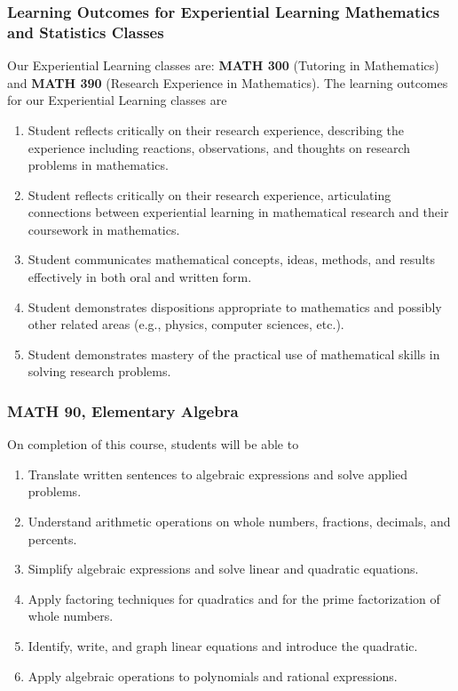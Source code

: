 \documentclass[11pt]{article}
\newenvironment{alphalist}{
\begin{enumerate}[label=(\arabic*),widest=107 ,leftmargin=25pt, itemsep=0pt]}
{\end{enumerate}}
\begin{document}
\subsubsection*{Learning Outcomes for Experiential Learning Mathematics and Statistics Classes}

Our Experiential Learning classes are: \textbf{MATH 300} 
(Tutoring in Mathematics) and \textbf{MATH 390} (Research Experience in Mathematics).
The learning outcomes for our Experiential Learning classes are
\begin{alphalist}
    \item  Student reflects critically on their research experience, describing the experience including reactions, observations, and thoughts on research problems in mathematics.
\item Student reflects critically on their research experience, articulating connections between experiential learning in mathematical research and their coursework in mathematics.
\item Student communicates mathematical concepts, ideas, methods, and results effectively in both oral and written form. 
\item Student demonstrates dispositions appropriate to mathematics and possibly other related areas (e.g., physics, computer sciences, etc.).
\item Student demonstrates mastery of the practical use of mathematical skills in solving research problems.
\end{alphalist}

\subsubsection*{MATH 90, Elementary Algebra}

On completion of this course, students will  be able to 
\begin{alphalist}
    \item Translate written sentences to algebraic expressions and solve applied problems.
    \item Understand arithmetic operations on whole numbers, fractions, decimals, and percents.
    \item Simplify algebraic expressions and solve linear and quadratic equations.
    \item Apply factoring techniques for quadratics and for the prime factorization of whole numbers.
    \item Identify, write, and graph linear equations and introduce the quadratic.
    \item Apply algebraic operations to polynomials and rational expressions.
\end{alphalist}
\end{document}
